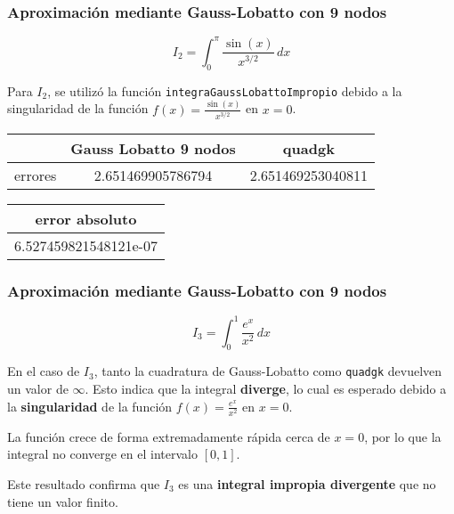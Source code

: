 \documentclass{beamer}
\begin{document}
\begin{frame} 
\frametitle{Aproximación mediante Gauss-Lobatto con 9 nodos}

\[
\displaystyle I_2 = \int_{0}^{\pi} \! \frac{\sin(x)}{x^{3/2}} \, dx
\]

Para \( I_2 \), se utilizó la función \texttt{integraGaussLobattoImpropio} debido a la singularidad de la función \( f(x) = \frac{\sin(x)}{x^{3/2}} \) en \( x = 0 \).

\vspace{1em}

\begin{table}[h]
    \centering
    \begin{tabular}{|c|c|c|}
        \hline
        \rowcolor{gray!30}
         & Gauss Lobatto 9 nodos & quadgk \\
        \hline
         errores & 2.651469905786794 & 2.651469253040811 \\
        \hline
    \end{tabular}
\end{table}

\vspace{0.5em}

\begin{table}[h]
    \centering
    \begin{tabular}{|c|}
        \hline
        \rowcolor{gray!30}
         error absoluto \\
        \hline
         6.527459821548121e-07 \\
        \hline
    \end{tabular}
\end{table}
\end{frame}



\begin{frame}
\frametitle{Aproximación mediante Gauss-Lobatto con 9 nodos}

\[
\displaystyle I_3 = \int_{0}^{1} \! \frac{e^x}{x^2} \, dx
\]

\vspace{1em}

En el caso de \( I_3 \), tanto la cuadratura de Gauss-Lobatto como \texttt{quadgk} devuelven un valor de \( \infty \).  
Esto indica que la integral \textbf{diverge}, lo cual es esperado debido a la \textbf{singularidad} de la función  
\( f(x) = \frac{e^x}{x^2} \) en \( x = 0 \).

\vspace{0.5em}

La función crece de forma extremadamente rápida cerca de \( x = 0 \), por lo que la integral no converge en el intervalo \( [0, 1] \).

\vspace{0.5em}

Este resultado confirma que \( I_3 \) es una \textbf{integral impropia divergente} que no tiene un valor finito.
\end{frame}
\end{document}
